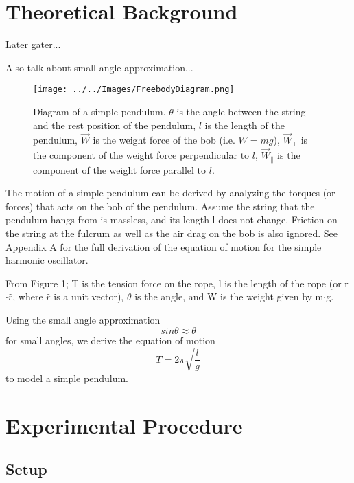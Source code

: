 \documentclass[iop,numberedappendix,appendixfloats]{emulateapj}
\begin{document}
\section{Theoretical Background}
\label{sec:theory}


Later gater...

Also talk about small angle approximation...


\begin{figure}[H]
\centering
\texttt{[image: ../../Images/FreebodyDiagram.png]}
\caption{Diagram of a simple pendulum. 
$\theta$ is the angle between the string
and the rest position of the pendulum, $l$ is the length of the pendulum,
$\vec{W}$ is the weight force of the bob (i.e. $W = mg$), $\vec{W}_\perp$ is the 
component of the weight force perpendicular to $l$, $\vec{W}_\parallel$ 
is the component of the weight force parallel to $l$.}
\label{Pendulum}
\end{figure}


The motion of a simple pendulum can be derived by analyzing the torques (or forces) that acts 
on the bob of the pendulum. Assume the string that the pendulum hangs from is massless, and
its length l does not change. Friction on the string at the fulcrum as well as the
air drag on the bob is also ignored. See Appendix A for the full derivation
of the equation of motion for the simple harmonic oscillator.


From Figure 1; T is the tension force on the rope, l is the length of the
rope (or r$\cdot\hat{r}$, where $\hat{r}$ is a unit vector), $\theta$ is the angle, and W is the weight given by m$\cdot$g.


Using the small angle approximation
\begin{equation}
\boxed{sin\theta \approx \theta}
\end{equation}
for small angles, we derive the equation of motion
\begin{equation}
\boxed{T = 2\pi\sqrt{\frac{l}{g}}}
\end{equation}
to model a simple pendulum.



\section{Experimental Procedure}
\label{sec:procedure}

\subsection{Setup}
\end{document}

